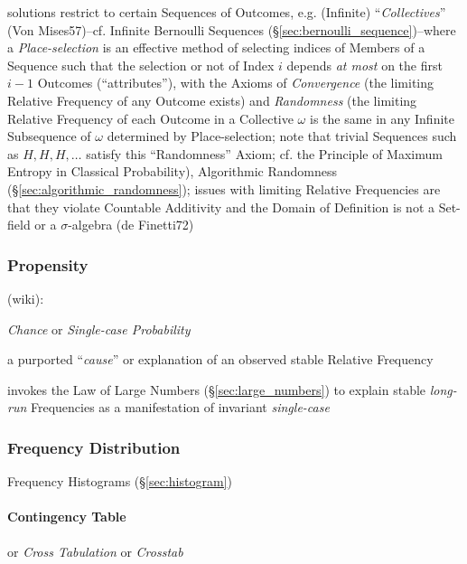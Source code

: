 solutions restrict to certain Sequences of Outcomes, e.g. (Infinite)
``\emph{Collectives}'' (Von Mises57)--cf. Infinite Bernoulli Sequences
(\S\ref{sec:bernoulli_sequence})--where a \emph{Place-selection} is an effective
method of selecting indices of Members of a Sequence such that the selection or
not of Index $i$ depends \emph{at most} on the first $i-1$ Outcomes
(``attributes''), with the Axioms of \emph{Convergence} (the limiting Relative
Frequency of any Outcome exists) and \emph{Randomness} (the limiting Relative
Frequency of each Outcome in a Collective $\omega$ is the same in any Infinite
Subsequence of $\omega$ determined by Place-selection; note that trivial
Sequences such as $H,H,H,\ldots$ satisfy this ``Randomness'' Axiom; cf. the
Principle of Maximum Entropy in Classical Probability), Algorithmic Randomness
(\S\ref{sec:algorithmic_randomness});
issues with limiting Relative Frequencies are that they violate Countable
Additivity and the Domain of Definition is not a Set-field or a $\sigma$-algebra
(de Finetti72)



\subsubsection{Propensity}\label{sec:propensity}

(wiki):

\emph{Chance} or \emph{Single-case Probability}

a purported ``\emph{cause}'' or explanation of an observed stable Relative
Frequency

invokes the Law of Large Numbers (\S\ref{sec:large_numbers}) to explain stable
\emph{long-run} Frequencies as a manifestation of invariant \emph{single-case}



\subsubsection{Frequency Distribution}\label{sec:frequency_distribution}

Frequency Histograms (\S\ref{sec:histogram})



\paragraph{Contingency Table}\label{sec:contingency_table}\hfill

or \emph{Cross Tabulation} or \emph{Crosstab}

